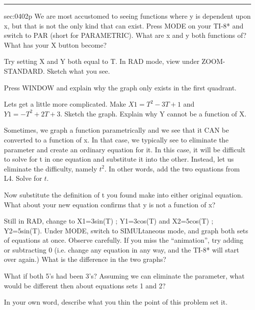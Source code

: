 \renewcommand{\columnseprule}{1.5pt}
\begin{multicols*}{2}
\rule[0.5\baselineskip]{0.4\textwidth}{1pt}
\noindent
{}\label{sec:0402p}
\begin{exercises}{sec:0402p}
\lab{} We are most accustomed to seeing functions where y is dependent upon x, but that is not the only kind that can exist.  Press MODE on your TI-8* and switch to PAR (short for PARAMETRIC).  What are x and y both functions of?  What has your X button become?

\vspace{3cm}
\lab{} Try setting X and Y both equal to T.  In RAD mode, view under ZOOM-STANDARD.  Sketch what you see.


\vspace{4cm}
\lab{} Press WINDOW and explain why the graph only exists in the first quadrant.


\vspace{3cm}
\lab{} Lets get a little more complicated.  Make $X1=T^2-3T+1$ and $Y1=-T^2+2T+3$.  Sketch the graph.  Explain why Y cannot be a function of X.


\vspace{3cm}
\lab{}  Sometimes, we graph a function parametrically and we see that it CAN be converted to a function of x.  In that case, we typically see to eliminate the parameter and create an ordinary equation for it.  In this case, it will be difficult to solve for t in one equation and substitute it into the other.   Instead, let us eliminate the difficulty, namely $t^2$.  In other words, add the two equations from L4.  Solve for $t$.


\vspace{3cm}
\lab{} Now substitute the definition of t you found make into either original equation.  What about your new equation confirms that y is not a function of x?

\vspace{3cm}
\lab{} Still in RAD, change to X1=3sin(T) ; Y1=3cos(T) and X2=5cos(T) ; Y2=5sin(T).  Under MODE, switch to SIMULtaneous mode, and graph both sets of equations at once.  Observe carefully.  If you miss the “animation”, try adding or subtracting 0 (i.e. change any equation in any way, and the TI-8* will start over again.)  What is the difference in the two graphs?

\vspace{3cm}
\lab{} What if both 5’s had been 3’s?  Assuming we can eliminate the parameter, what would be different then about equations sets 1 and 2?

\vspace{3cm}
\lab{} In your own word, describe what you thin the point of this problem set it.



\end{exercises}
\end{multicols*}